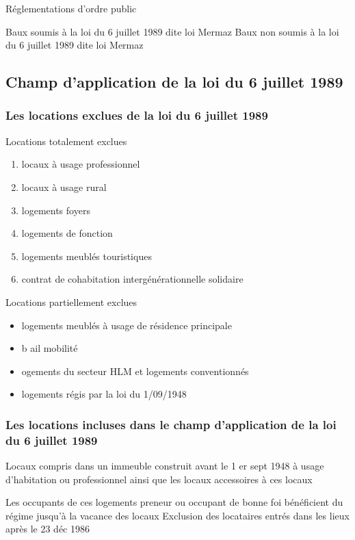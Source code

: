 \documentclass[10pt,a4paper,twoside]{article}
\begin{document}
	Réglementations d’ordre public

	Baux soumis à la loi du 6 juillet 1989 dite loi Mermaz
	Baux non soumis à la loi du 6 juillet 1989 dite loi
	Mermaz

	\subsection{Champ d’application de la loi du 6 juillet 1989}

		\subsubsection{Les locations exclues de la loi du 6 juillet 1989}

			Locations totalement exclues
			\begin{enumerate}
				\item locaux à usage professionnel
				\item locaux à usage rural
				\item logements foyers
				\item logements de fonction
				\item logements meublés touristiques
				\item contrat de cohabitation intergénérationnelle solidaire
			\end{enumerate}


			Locations partiellement exclues
			\begin{itemize}
				\item logements meublés à usage de résidence principale
				\item b ail mobilité
				\item ogements du secteur HLM et logements conventionnés
				\item logements régis par la loi du 1/09/1948
			\end{itemize}


		\subsubsection{Les locations incluses dans le champ d’application de la loi du 6 juillet 1989}

			Locaux compris dans un immeuble construit avant le 1 er sept
			1948 à usage d’habitation ou professionnel ainsi que les
			locaux accessoires à ces locaux

			Les occupants de ces logements preneur ou occupant de
			bonne foi bénéficient du régime jusqu’à la vacance des
			locaux Exclusion des locataires entrés dans les lieux après le
			23 déc 1986
\end{document}
